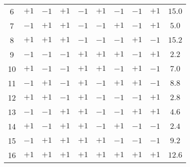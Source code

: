 \begin{itemize}
\begin{table}[!htbp]
\begin{tabular}{cccccccccc}
                        6         & $+1$ & $-1$ & $+1$ & $-1$ & $+1$                  & $-1$                  & $-1$                  & $+1$                  & $15.0$                          \\
                        7         & $-1$ & $+1$ & $+1$ & $-1$ & $-1$                  & $+1$                  & $-1$                  & $+1$                  & $5.0$                           \\
                        8         & $+1$ & $+1$ & $+1$ & $-1$ & $-1$                  & $-1$                  & $+1$                  & $-1$                  & $15.2$                          \\
                        9         & $-1$ & $-1$ & $-1$ & $+1$ & $+1$                  & $+1$                  & $-1$                  & $+1$                  & $2.2$                           \\
                        10        & $+1$ & $-1$ & $-1$ & $+1$ & $+1$                  & $-1$                  & $+1$                  & $-1$                  & $7.0$                           \\
                        11        & $-1$ & $+1$ & $-1$ & $+1$ & $-1$                  & $+1$                  & $+1$                  & $-1$                  & $8.8$                           \\
                        12        & $+1$ & $+1$ & $-1$ & $+1$ & $-1$                  & $-1$                  & $-1$                  & $+1$                  & $2.8$                           \\
                        13        & $-1$ & $-1$ & $+1$ & $+1$ & $-1$                  & $-1$                  & $+1$                  & $+1$                  & $4.6$                           \\
                        14        & $+1$ & $-1$ & $+1$ & $+1$ & $-1$                  & $+1$                  & $-1$                  & $-1$                  & $2.4$                           \\
                        15        & $-1$ & $+1$ & $+1$ & $+1$ & $+1$                  & $-1$                  & $-1$                  & $-1$                  & $9.2$                           \\
                        16        & $+1$ & $+1$ & $+1$ & $+1$ & $+1$                  & $+1$                  & $+1$                  & $+1$                  & $12.6$                          \\
                        \bottomrule

\end{tabular}
\end{table}
\end{itemize}
